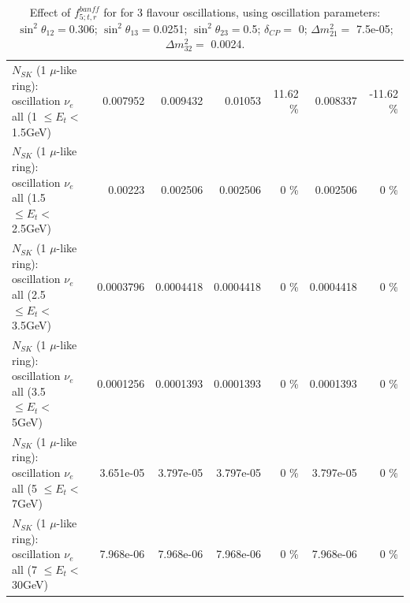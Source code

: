 \begin{table}
\begin{tabular}{| l | r | r | r  r | r  r |}
$N_{SK}$ (1 $\mu$-like ring): oscillation $\nu_{e}$ all (1 $\leq E_{t} <$ 1.5GeV) &        0.007952 &        0.009432 &         0.01053 &    11.62 \%  &        0.008337 &   -11.62 \%  \\ 
$N_{SK}$ (1 $\mu$-like ring): oscillation $\nu_{e}$ all (1.5 $\leq E_{t} <$ 2.5GeV) &         0.00223 &        0.002506 &        0.002506 &        0 \%  &        0.002506 &        0 \%  \\ 
$N_{SK}$ (1 $\mu$-like ring): oscillation $\nu_{e}$ all (2.5 $\leq E_{t} <$ 3.5GeV) &       0.0003796 &       0.0004418 &       0.0004418 &        0 \%  &       0.0004418 &        0 \%  \\ 
$N_{SK}$ (1 $\mu$-like ring): oscillation $\nu_{e}$ all (3.5 $\leq E_{t} <$ 5GeV) &       0.0001256 &       0.0001393 &       0.0001393 &        0 \%  &       0.0001393 &        0 \%  \\ 
 $N_{SK}$ (1 $\mu$-like ring): oscillation $\nu_{e}$ all (5 $\leq E_{t} <$ 7GeV) &       3.651e-05 &       3.797e-05 &       3.797e-05 &        0 \%  &       3.797e-05 &        0 \%  \\ 
$N_{SK}$ (1 $\mu$-like ring): oscillation $\nu_{e}$ all (7 $\leq E_{t} <$ 30GeV) &       7.968e-06 &       7.968e-06 &       7.968e-06 &        0 \%  &       7.968e-06 &        0 \%  \\ 
\hline
\hline
\end{tabular}
\caption{ Effect of $f_{5; t, r}^{banff}$ for for 3 flavour oscillations, using oscillation parameters:  $\sin^2\theta_{12} = $0.306; $\sin^2\theta_{13} = $0.0251; $\sin^2\theta_{23} = $0.5; $\delta_{CP} = $        0; $\Delta m^2_{21} = $    7.5e-05; $\Delta m^2_{32} = $    0.0024. }
\label{tab:num_banff_05_1RmuT_3f_osc_t13:0.0251}
\end{table}
\clearpage
